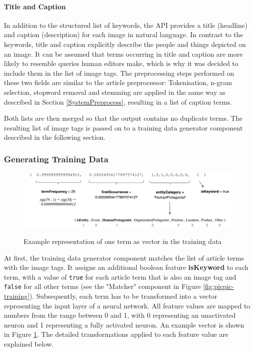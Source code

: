 \documentclass[11pt,a4paper,twoside]{article}
\begin{document}
\paragraph{Title and Caption} In addition to the structured list of keywords, the API provides a title (headline) and caption (description) for each image in natural language. In contrast to the keywords, title and caption explicitly describe the people and things depicted on an image. It can be assumed that terms occurring in title and caption are more likely to resemble queries human editors make, which is why it was decided to include them in the list of image tags. The preprocessing steps performed on these two fields are similar to the article preprocessor: Tokenisation, n-gram selection, stopword removal and stemming are applied in the same way as described in Section \ref{SystemPreprocess}, resulting in a list of caption terms.

Both lists are then merged so that the output contains no duplicate terms. The resulting list of image tags is passed on to a training data generator component described in the following section.

\subsubsection{Generating Training Data} \label{SystemTrainGenerate}

\begin{figure}[h]
    \caption{Example representation of one term as vector in the training data}
    \centering
    \includegraphics[width=\columnwidth]{example-training-term.png}
    \label{fig:example-training-term}
\end{figure}

\noindent At first, the training data generator component matches the list of article terms with the image tags. It assigns an additional boolean feature \textbf{isKeyword} to each term, with a value of \lstinline{true} for each article term that is also an image tag and \lstinline{false} for all other terms (see the "Matcher" component in Figure \ref{fig:picpic-training}). Subsequently, each term has to be transformed into a vector representing the input layer of a neural network. All feature values are mapped to numbers from the range between 0 and 1, with 0 representing an unactivated neuron and 1 representing a fully activated neuron. An example vector is shown in Figure \ref{fig:example-training-term}. The detailed transformations applied to each feature value are explained below.
\end{document}
